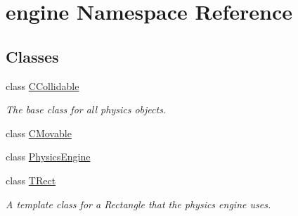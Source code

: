 \hypertarget{namespaceengine}{\section{engine Namespace Reference}
\label{namespaceengine}
}
\subsection*{Classes}
\begin{DoxyCompactItemize}
\item 
class \hyperlink{classengine_1_1CCollidable}{C\-Collidable}
\begin{DoxyCompactList}\small\item\em The base class for all physics objects. \end{DoxyCompactList}\item 
class \hyperlink{classengine_1_1CMovable}{C\-Movable}
\item 
class \hyperlink{classengine_1_1PhysicsEngine}{Physics\-Engine}
\item 
class \hyperlink{classengine_1_1TRect}{T\-Rect}
\begin{DoxyCompactList}\small\item\em A template class for a Rectangle that the physics engine uses. \end{DoxyCompactList}\end{DoxyCompactItemize}
